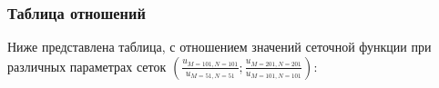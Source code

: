 \documentclass[a4paper,12pt]{article}
\begin{document}

\subsubsection*{Таблица отношений}
Ниже представлена таблица, с отношением значений сеточной функции при различных параметрах сеток \(\left(\frac{u_{M=101,N=101}}{u_{M=51,N=51}};\frac{u_{M=201,N=201}}{u_{M=101,N=101}}\right)\):

\hspace{-5em}

\end{document}
